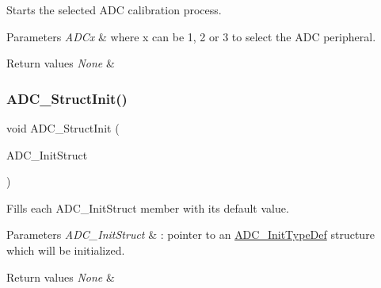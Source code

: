 Starts the selected A\+DC calibration process. 


\begin{DoxyParams}{Parameters}
{\em A\+D\+Cx} & where x can be 1, 2 or 3 to select the A\+DC peripheral. \\
\hline
\end{DoxyParams}

\begin{DoxyRetVals}{Return values}
{\em None} & \\
\hline
\end{DoxyRetVals}
\mbox{\label{group___a_d_c___private___functions_ga6c6e754d1d0a98d56e465efaf73272ec}} 
\subsubsection{\texorpdfstring{ADC\_StructInit()}{ADC\_StructInit()}}
{\footnotesize\ttfamily void A\+D\+C\+\_\+\+Struct\+Init (\begin{DoxyParamCaption}\item[{\mbox{\hyperlink{struct_a_d_c___init_type_def}{A\+D\+C\+\_\+\+Init\+Type\+Def}} $\ast$}]{A\+D\+C\+\_\+\+Init\+Struct }\end{DoxyParamCaption})}



Fills each A\+D\+C\+\_\+\+Init\+Struct member with its default value. 


\begin{DoxyParams}{Parameters}
{\em A\+D\+C\+\_\+\+Init\+Struct} & \+: pointer to an \mbox{\hyperlink{struct_a_d_c___init_type_def}{A\+D\+C\+\_\+\+Init\+Type\+Def}} structure which will be initialized. \\
\hline
\end{DoxyParams}

\begin{DoxyRetVals}{Return values}
{\em None} & \\
\hline
\end{DoxyRetVals}
\mbox{\label{group___a_d_c___private___functions_ga848682e2d7d3de9f8cf03ffa4c11f0b5}} 
